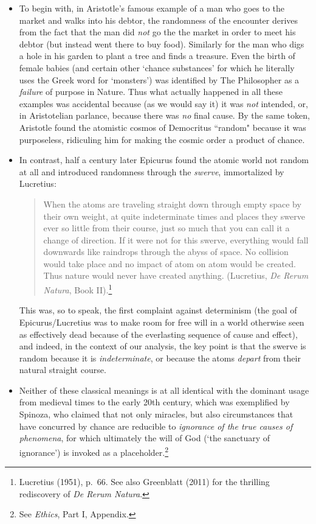 \documentclass[12pt]{article}
\numberwithin{equation}{section}
\begin{document}
 \begin{itemize}
\item To begin with, in Aristotle's famous example of a man who goes to the market and  walks into his debtor, the randomness of the encounter derives from the fact that the man did \emph{not} go the the market in order to meet his debtor (but instead went there to buy food). Similarly for the man who digs a hole in his garden to plant a tree and finds a treasure. Even the birth of female babies (and certain other `chance substances' for which he literally uses the Greek word for `monsters') was identified by The Philosopher  as a \emph{failure} of purpose in Nature. Thus what actually happened in all these examples was accidental because (as we would say it) it was \emph{not} intended, or, in Aristotelian parlance, because there was \emph{no} final cause. By the same token, Aristotle found the atomistic cosmos of Democritus ``random" because it was purposeless,  ridiculing him for making the cosmic order a product of chance. 
\item  In contrast,  half a century later Epicurus found the atomic world not random at all and introduced randomness through the \emph{swerve}, immortalized by Lucretius:
\begin{quote}\begin{small}
When the atoms are traveling straight down through empty space by their own weight, at quite indeterminate times and places they swerve ever so little from their course, just so much that you can call it a change of direction. If it were not for this swerve, everything would fall downwards like raindrops through the abyss of space. No collision would take place and no impact of atom on atom would be created. Thus nature would never have created anything. (Lucretius, \emph{De Rerum Natura}, Book II).\footnote{ Lucretius (1951), p.\ 66.  See also Greenblatt (2011) for the thrilling rediscovery of \emph{De Rerum Natura}.} \end{small}
\end{quote} 
This was, so to speak, the first complaint against determinism (the goal of Epicurus/Lucretius was to make room for free will in a world otherwise seen as effectively dead because of the everlasting sequence of cause and effect), and indeed, in the context of our analysis, the key point is that the swerve is random because it is \emph{indeterminate}, or because the atoms \emph{depart} from their natural straight course. 
\item Neither of these classical meanings is at all  identical with the dominant usage from medieval times to the early 20th century, which was exemplified by Spinoza, who  claimed that not only miracles, but also circumstances that have concurred by chance are reducible to \emph{ignorance of the true causes of phenomena}, for which ultimately the will of God (`the sanctuary of ignorance') is invoked as a placeholder.\footnote{See \emph{Ethics}, Part I, Appendix.} 

\end{itemize}
\end{document}
